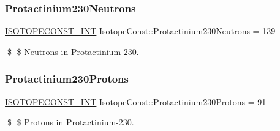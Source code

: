 \subsubsection{\texorpdfstring{Protactinium230\+Neutrons}{Protactinium230Neutrons}}
{\footnotesize\ttfamily \mbox{\hyperlink{group___isotope_const-_macros_ga5f18360b3e99483a35c32d789e62621c}{I\+S\+O\+T\+O\+P\+E\+C\+O\+N\+S\+T\+\_\+\+I\+NT}} Isotope\+Const\+::\+Protactinium230\+Neutrons = 139}

\$ \$ Neutrons in Protactinium-\/230. \mbox{\label{group___isotope_const-_protactinium-_pa230_gac0e75eae56ec3d78be78ab759043a00c}} 
\subsubsection{\texorpdfstring{Protactinium230\+Protons}{Protactinium230Protons}}
{\footnotesize\ttfamily \mbox{\hyperlink{group___isotope_const-_macros_ga5f18360b3e99483a35c32d789e62621c}{I\+S\+O\+T\+O\+P\+E\+C\+O\+N\+S\+T\+\_\+\+I\+NT}} Isotope\+Const\+::\+Protactinium230\+Protons = 91}

\$ \$ Protons in Protactinium-\/230. 
